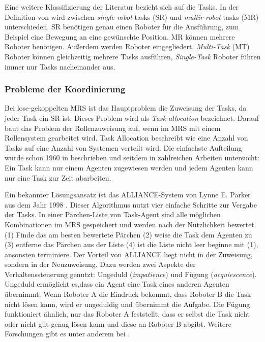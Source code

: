 Eine weitere Klassifizierung der Literatur bezieht sich auf die Tasks. In der Definition von \cite{gerkey2004formal} wird zwischen \textit{single-robot} tasks (SR) und \textit{multir-robot} tasks (MR) unterschieden. SR benötigen genau einen Roboter für die Ausführung, zum Beispiel eine Bewegung an eine gewünschte Position. MR können mehrere Roboter benötigen. Außerdem werden Roboter eingegliedert.\textit{ Multi-Task} (MT) Roboter können gleichzeitig mehrere Tasks ausführen, \textit{Single-Task} Roboter führen immer nur Tasks nacheinander aus.\cite{lundh2006plan} 

\subsubsection{Probleme der Koordinierung}
Bei lose-gekoppelten MRS ist das Hauptproblem die Zuweisung der Tasks, da jeder Task ein SR ist. Dieses Problem wird als \textit{Task allocation} bezeichnet. Darauf baut das Problem der Rollenzuweisung auf, wenn im MRS mit einem Rollensystem gearbeitet wird. Task Allocation beschreibt wie eine Anzahl von Tasks auf eine Anzahl von Systemen verteilt wird. Die einfachste Aufteilung wurde schon 1960 in \cite{gale1989theory} beschrieben und seitdem in zahlreichen Arbeiten untersucht: Ein Task kann nur einem Agenten zugewiesen werden und jedem Agenten kann nur eine Task zur Zeit abarbeiten.

Ein bekannter Lösungsansatz ist das ALLIANCE-System von Lynne E. Parker aus dem Jahr 1998 \cite{parker1998alliance}. Dieser Algorithmus nutzt vier einfache Schritte zur Vergabe der Tasks. In einer Pärchen-Liste von Task-Agent sind alle möglichen Kombinationen im MRS gespeichert und werden nach der Nützlichkeit bewertet. (1) Finde das am besten bewertete Pärchen (2) weise die Task dem Agenten zu (3) entferne das Pärchen aus der Liste (4) ist die Liste nicht leer beginne mit (1), ansonsten terminiere. Der Vorteil von ALLIANCE liegt nicht in der Zuweisung, sondern in der Neuzuweisung. Dazu werden zwei Aspekte der Verhaltenssteuerung genutzt: Ungeduld (\textit{impatience}) und Fügung (\textit{acquiescence}). Ungeduld ermöglicht es,dass ein Agent eine Task eines anderen Agenten übernimmt. Wenn Roboter A die Eindruck bekommt, dass Roboter B die Task nicht lösen kann, wird er ungeduldig und übernimmt die Aufgabe. Die Fügung funktioniert ähnlich, nur das Roboter A feststellt, dass er selbst die Task nicht oder nicht gut genug lösen kann und diese an Roboter B abgibt. Weitere Forschungen gibt es unter anderem bei \cite{werger2000broadcast}.

